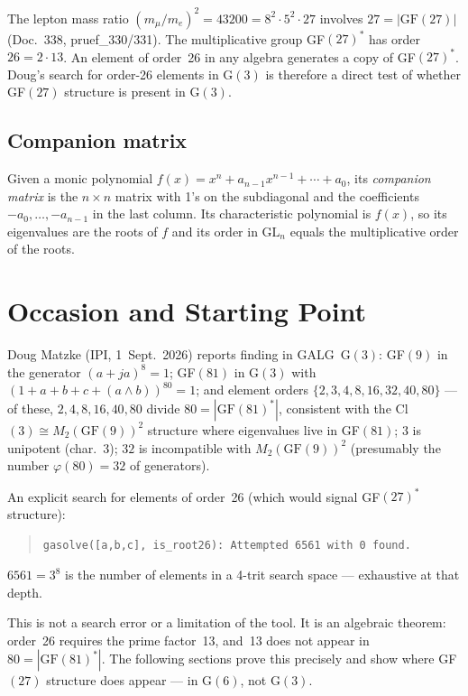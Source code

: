 The lepton mass ratio $(m_\mu/m_e)^2 = 43200 = 8^2 \cdot 5^2 \cdot 27$
involves $27 = |\text{GF}(27)|$ (Doc.~338, pruef\_330/331).
The multiplicative group GF$(27)^*$ has order~$26 = 2 \cdot 13$.
An element of order~26 in any algebra generates a copy of GF$(27)^*$.
Doug's search for order-26 elements in G$(3)$ is therefore a direct
test of whether GF$(27)$ structure is present in G$(3)$.

\subsection*{Companion matrix}

Given a monic polynomial $f(x) = x^n + a_{n-1}x^{n-1} + \cdots + a_0$,
its \emph{companion matrix} is the $n \times n$ matrix with 1's on
the subdiagonal and the coefficients $-a_0, \ldots, -a_{n-1}$
in the last column. Its characteristic polynomial is $f(x)$,
so its eigenvalues are the roots of $f$ and its order in $\text{GL}_n$
equals the multiplicative order of the roots.

\section{Occasion and Starting Point}

Doug Matzke (IPI, 1~Sept.~2026) reports finding in GALG~G$(3)$:
GF$(9)$ in the generator $(a+ja)^8 = 1$;
GF$(81)$ in G$(3)$ with $(1+a+b+c+(a\wedge b))^{80} = 1$;
and element orders $\{2,3,4,8,16,32,40,80\}$ --- of these, $2,4,8,16,40,80$ divide
$80 = |\text{GF}(81)^*|$, consistent with the Cl$(3) \cong M_2(\text{GF}(9))^2$
structure where eigenvalues live in GF$(81)$; $3$ is unipotent (char.~3); $32$ is incompatible with $M_2(\text{GF}(9))^2$ (presumably the number $\varphi(80) = 32$ of generators).

An explicit search for elements of order~26 (which would signal GF$(27)^*$
structure):
\begin{quote}
\texttt{gasolve([a,b,c], is\_root26): Attempted 6561 with 0 found.}
\end{quote}
$6561 = 3^8$ is the number of elements in a 4-trit search space ---
exhaustive at that depth.

This is not a search error or a limitation of the tool.
It is an algebraic theorem: order~26 requires the prime factor~13,
and~13 does not appear in $80 = |\text{GF}(81)^*|$.
The following sections prove this precisely and show where
GF$(27)$ structure does appear --- in G$(6)$, not G$(3)$.

